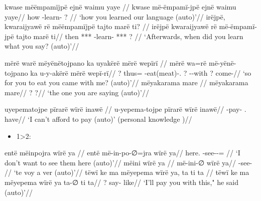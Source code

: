 \documentclass{memoir}
\begin{document}
\pex\label{learn}    \a     \label{convhistfamsjm-15}        \begingl
        \glpreamble kwase mëëmpamïjpë ejnë waimu yaye //
        \gla kwase më-ëmpamï-jpë ejnë waimu yaye//
        \glb how -learn-  ? //
            \glft ‘how you learned our language (auto)’//  
        \endgl 
    \a     \label{convhistfamsjm-238}        \begingl
        \glpreamble irëjpë, kwaraijyawë rë mëëmpamïjpë tajto marë ti? //
        \gla irëjpë kwaraijyawë rë më-ëmpamï-jpë tajto marë ti//
        \glb then ***  -learn- *** ? //
            \glft ‘Afterwards, when did you learn what you say? (auto)’//  
        \endgl 
\xe

\pex\label{2sub}    \a     \label{convfemgrme-43}        \begingl
        \glpreamble mërë warë mëyënëtojpano ka uyakërë mërë wepïrï //
        \gla mërë wa=rë më-yënë-tojpano ka u-y-akërë mërë wepï-rï//
        \glb ? thus= -eat(meat)-. ? --with ? come-//
            \glft ‘so for you to eat you came with me? (auto)’//  
        \endgl 
    \a     \label{ctoaragrme-5}        \begingl
        \glpreamble mëyakarama mare //
        \gla mëyakarama mare//
        \glb ? ?//
            \glft ‘the one you are saying (auto)’//  
        \endgl 
\xe

\ex \label{1sub}
\begingl \glpreamble uyepematojpe pïrarë wïrë inawë //
\gla u-yepema-tojpe pïrarë wïrë inawë//
\glb {}-pay- .  have//
\glft ‘I can't afford to pay (auto)’ (personal knowledge
)//
\endgl
\xe

\begin{itemize}
\tightlist
\item
  1\textgreater2:
\end{itemize}

\pex\label{}    \a     \label{convfemgrme-231}        \begingl
       \glpreamble entë mëinpojra wïrë ya //
       \gla entë më-in-po-∅=jra wïrë ya//
       \glb here. -see--=  //
           \glft ‘I don't want to see them here (auto)’//  
       \endgl 
   \a     \label{convfemgrme-232}        \begingl
       \glpreamble mëini wïrë ya //
       \gla më-ini-∅ wïrë ya//
       \glb {}-see-  //
           \glft ‘te voy a ver (auto)’//  
       \endgl 
   \a     \label{ctovarmafl-283}        \begingl
       \glpreamble tëwï ke ma mëyepema wïrë ya, ta ti ta //
       \gla tëwï ke ma mëyepema wïrë ya ta-∅ ti ta//
       \glb {}   ?   say-  like//
           \glft ‘I'll pay you with this," he said (auto)’//  
       \endgl 
\xe
\end{document}
